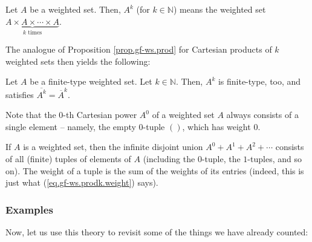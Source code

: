 \begin{definition}
Let $A$ be a weighted set. Then, $A^{k}$ (for $k\in\mathbb{N}$) means the
weighted set $\underbrace{A\times A\times\cdots\times A}_{k\text{ times}}$.
\end{definition}

The analogue of Proposition \ref{prop.gf-ws.prod} for Cartesian products of
$k$ weighted sets then yields the following:

\begin{proposition}
\label{prop.gf-ws.pow}Let $A$ be a finite-type weighted set. Let
$k\in\mathbb{N}$. Then, $A^{k}$ is finite-type, too, and satisfies
$\overline{A^{k}}=\overline{A}^{k}$.
\end{proposition}

Note that the $0$-th Cartesian power $A^{0}$ of a weighted set $A$ always
consists of a single element -- namely, the empty $0$-tuple $\left(
{}\right)  $, which has weight $0$.

If $A$ is a weighted set, then the infinite disjoint union $A^{0}+A^{1}%
+A^{2}+\cdots$ consists of all (finite) tuples of elements of $A$ (including
the $0$-tuple, the $1$-tuples, and so on). The weight of a tuple is the sum of
the weights of its entries (indeed, this is just what
(\ref{eq.gf-ws.prodk.weight}) says).

\subsubsection{Examples}

Now, let us use this theory to revisit some of the things we have already counted:

